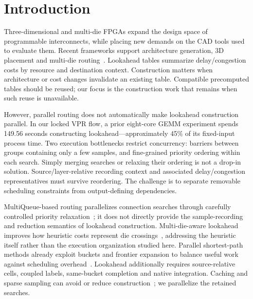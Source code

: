 \section{Introduction}
Three-dimensional and multi-die FPGAs expand the design space of programmable interconnects, while placing new demands on the CAD tools used to evaluate them. Recent frameworks support architecture generation, 3D placement and multi-die routing~\cite{lazagna,flatland,multidie}. Lookahead tables summarize delay/congestion costs by resource and destination context. Construction matters when architecture or cost changes invalidate an existing table. Compatible precomputed tables should be reused; our focus is the construction work that remains when such reuse is unavailable.

However, parallel routing does not automatically make lookahead construction parallel. In our locked VPR flow, a prior eight-core GEMM experiment spends 149.56 seconds constructing lookahead---approximately 45\% of its fixed-input process time. Two execution bottlenecks restrict concurrency: barriers between groups containing only a few samples, and fine-grained priority ordering within each search. Simply merging searches or relaxing their ordering is not a drop-in solution. Source/layer-relative recording context and associated delay/congestion representatives must survive reordering. The challenge is to separate removable scheduling constraints from output-defining dependencies.

MultiQueue-based routing parallelizes connection searches through carefully controlled priority relaxation~\cite{multiqueue}; it does not directly provide the sample-recording and reduction semantics of lookahead construction. Multi-die-aware lookahead improves how heuristic costs represent die crossings~\cite{multidie}, addressing the heuristic itself rather than the execution organization studied here. Parallel shortest-path methods already exploit buckets and frontier expansion to balance useful work against scheduling overhead~\cite{delta,gpu_sssp}. Lookahead additionally requires source-relative cells, coupled labels, same-bucket completion and native integration. Caching and sparse sampling can avoid or reduce construction~\cite{vproptions}; we parallelize the retained searches.

